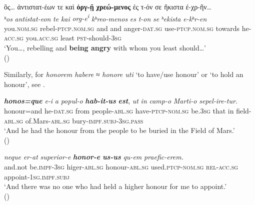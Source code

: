 \documentclass[output=paper,colorlinks,citecolor=brown]{langscibook}
\begin{document}
\glll ὃς\ldots{} ἀντιστατ-έων τε καὶ \textbf{ὀργ-ῇ} \textbf{χρεώ-μενος} ἐς τ-όν σε ἥκιστα ἐ-χρ-ῆν\ldots{}\\
 \textit{ʰos} \textit{antistat-eon} \textit{te} \textit{kai} \textit{org-e\textsuperscript{i}}
\textit{kʰreo-menos} \textit{es} \textit{t-on} \textit{se} \textit{ʰekista} \textit{e-kʰr-en}\\
you.\textsc{nom.sg} rebel-\textsc{ptcp.nom.sg} and and anger-\textsc{dat.sg} use-\textsc{ptcp.nom.sg} towards he-\textsc{acc.sg} you.\textsc{acc.sg} least
\textsc{pst-}should-\textsc{3sg}\\
\glt `You\ldots, rebelling and \textbf{being angry} with whom you least should\ldots' \\
\hspace*{\fill}()
\z
\z\clearpage


Similarly, for \emph{honorem habere} ≈ \emph{honore uti} `to have/use honour' or `to hold an
honour', see .


\ea\label{ex:ma:10}

\ea\label{ex:ma:10a}

\gll \textbf{\itshape honos=que} \emph{e-i} \emph{a} \emph{popul-o} \textbf{\itshape
  hab-it-us} \textbf{\itshape est}, \emph{ut} \emph{in} \emph{camp-o} \emph{Marti-o} \emph{sepel-ire-tur.}\\
honour=and he-\textsc{dat.sg} from people-\textsc{abl.sg} have-\textsc{ptcp-nom.sg}
be.3\textsc{sg} that in field-\textsc{abl.sg} of.Mars-\textsc{abl.sg}
bury-\textsc{impf.subj-3sg.pass}\\
\glt `And he had the honour from the people to be buried in the Field of
Mars.' \\
\hspace*{\fill}()

\ex\label{ex:ma:10b}

\gll \emph{neque} \emph{er-at} \emph{superior-e} \textbf{\itshape honor-e}
\textbf{\itshape us-us} \emph{qu-em} \emph{praefic-erem.}\\
and.not be.\textsc{impf-3sg} higer-\textsc{abl.sg} honour-\textsc{abl.sg}
used\textsc{.ptcp}-\textsc{nom.sg} \textsc{rel-acc.sg} appoint-\textsc{1sg.impf.subj}\\
\glt `And there was no one who had held a higher honour for me to appoint.' \\
\hspace*{\fill}()
\end{document}
